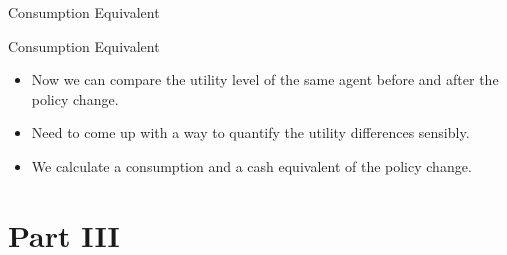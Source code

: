 \documentclass{beamer}
\begin{document}
\begin{frame}{Consumption Equivalent}
\end{frame}

\begin{frame}{Consumption Equivalent}
  \begin{itemize}
  \item {
  Now we can compare the utility level of the same agent before and after the policy change.
  }
  \item {
  Need to come up with a way to quantify the utility differences sensibly.
  }
  \item {
  We calculate a consumption and a cash equivalent of the policy change.
  }
  \end{itemize}
\end{frame}

\section{Part III}
\subsection{}
\end{document}

